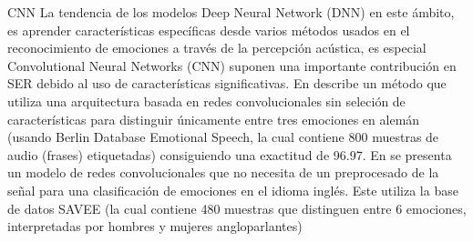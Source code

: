 \documentclass[11pt,a4paper,spanish]{book}
\begin{document}
	CNN
	La tendencia de los modelos Deep Neural Network (DNN) en este ámbito, es aprender características específicas desde varios métodos usados en el reconocimiento de emociones a través de la percepción acústica, es especial Convolutional Neural Networks (CNN) suponen una importante contribución en SER debido al uso de características significativas.
	En \cite{Harar2017} describe un método que utiliza una arquitectura basada en redes convolucionales sin seleción de características para distinguir únicamente entre tres emociones en alemán (usando Berlin Database Emotional Speech, la cual contiene 800 muestras de audio (frases) etiquetadas) consiguiendo una exactitud de 96.97. En \cite{AbdulQayyum2019} se presenta un modelo de redes convolucionales que no necesita de un preprocesado de la señal para una clasificación de emociones en el idioma inglés. Este utiliza la base de datos SAVEE (la cual contiene 480 muestras que distinguen entre 6 emociones, interpretadas por hombres y mujeres angloparlantes)
	
	\printbibliography
	
\end{document}
